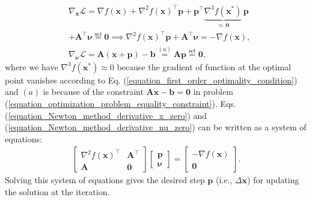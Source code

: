 \documentclass[lang=cn,10pt]{gorgeousnbook}
\numberwithin{equation}{section}%
\numberwithin{figure}{section}%
\begin{document}
\begin{align}
& \nabla_{\boldsymbol{x}} \mathcal{L} = \nabla f(\boldsymbol{x}) + \nabla^2 f(\boldsymbol{x})^\top \boldsymbol{p} + \boldsymbol{p}^\top \underbrace{\nabla^3 f(\boldsymbol{x}^*)}_{\approx\, \boldsymbol{0}}\, \boldsymbol{p} \nonumber \\
&+ \boldsymbol{A}^\top \boldsymbol{\nu} \overset{\text{set}}{=} \boldsymbol{0} \implies \nabla^2 f(\boldsymbol{x})^\top \boldsymbol{p} + \boldsymbol{A}^\top \boldsymbol{\nu} = - \nabla f(\boldsymbol{x}), \label{equation_Newton_method_derivative_x_zero} \\
& \nabla_{\boldsymbol{\nu}} \mathcal{L} = \boldsymbol{A} (\boldsymbol{x} + \boldsymbol{p}) - \boldsymbol{b} \overset{(a)}{=} \boldsymbol{A} \boldsymbol{p} \overset{\text{set}}{=} \boldsymbol{0}, \label{equation_Newton_method_derivative_nu_zero}
\end{align}
where we have $\nabla^3 f(\boldsymbol{x}^*) \approx 0$ because the gradient of function at the optimal point vanishes according to Eq. (\ref{equation_first_order_optimality_condition}) and $(a)$ is because of the constraint $\boldsymbol{Ax} - \boldsymbol{b} = \boldsymbol{0}$ in problem (\ref{equation_optimization_problem_equality_constraint}).
Eqs. (\ref{equation_Newton_method_derivative_x_zero}) and (\ref{equation_Newton_method_derivative_nu_zero}) can be written as a system of equations:
\begin{align}\label{equation_Newton_method_equality_constraints_solution}
\begin{bmatrix}
\nabla^2 f(\boldsymbol{x})^\top & \boldsymbol{A}^\top \\
\boldsymbol{A} & \boldsymbol{0}
\end{bmatrix}
\begin{bmatrix}
\boldsymbol{p} \\
\boldsymbol{\nu}
\end{bmatrix} 
=
\begin{bmatrix}
-\nabla f(\boldsymbol{x}) \\
\boldsymbol{0}
\end{bmatrix}.
\end{align}
Solving this system of equations gives the desired step $\boldsymbol{p}$ (i.e., $\Delta \boldsymbol{x}$) for updating the solution at the iteration.
\end{document}
